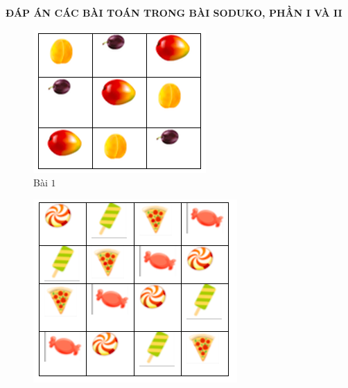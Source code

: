 \newpage
\begin{center}
	\textbf{ĐÁP ÁN CÁC BÀI TOÁN TRONG BÀI SODUKO, PHẦN I VÀ II}
\end{center}
\begin{multicols}{2}
	\begin{figure}[H]
		\centering
		\vspace*{-5pt}
		\captionsetup{labelformat= empty, justification=centering}
		\includegraphics[width=0.9\linewidth]{sudoku1}
		\caption{\small{Bài $1$}}
		\vspace*{-10pt}
	\end{figure}
	\begin{figure}[H]
		\centering
		\vspace*{-5pt}
		\captionsetup{labelformat= empty, justification=centering}
		\includegraphics[width=0.9\linewidth]{sudoku2}

\end{figure}
\end{multicols}
